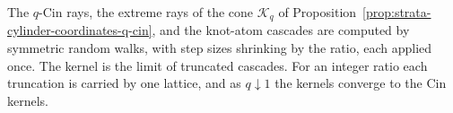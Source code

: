 The $q$-Cin rays, the extreme rays of the cone $\mathcal{K}_q$ of
Proposition~\ref{prop:strata-cylinder-coordinates-q-cin}, and the knot-atom cascades are computed
by symmetric random walks, with step sizes shrinking by the ratio, each applied once. The kernel is
the limit of truncated cascades. For an integer ratio each truncation is carried by one lattice,
and as $q \downarrow 1$ the kernels converge to the Cin kernels.

